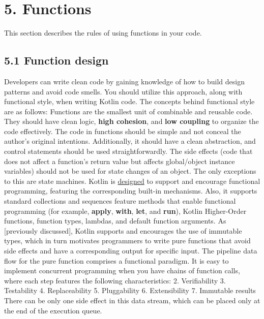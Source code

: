 \section*{\textbf{5. Functions}}
\label{sec:5.}
This section describes the rules of using functions in your code.
\subsection*{\textbf{5.1 Function design}}
\label{sec:5.1}
Developers can write clean code by gaining knowledge of how to build design patterns and avoid code smells.
You should utilize this approach, along with functional style, when writing Kotlin code.
The concepts behind functional style are as follows:
Functions are the smallest unit of combinable and reusable code.
They should have clean logic, \textbf{high cohesion}, and \textbf{low coupling} to organize the code effectively.
The code in functions should be simple and not conceal the author's original intentions.
Additionally, it should have a clean abstraction, and control statements should be used straightforwardly.
The side effects (code that does not affect a function's return value but affects global/object instance variables) should not be used for state changes of an object.
The only exceptions to this are state machines.
Kotlin is \href{https://www.slideshare.net/abreslav/whos-more-functional-kotlin-groovy-scala-or-java}{designed} to support and encourage functional programming, featuring the corresponding built-in mechanisms.
Also, it supports standard collections and sequences feature methods that enable functional programming (for example, \textbf{apply}, \textbf{with}, \textbf{let}, and \textbf{run}), Kotlin Higher-Order functions, function types, lambdas, and default function arguments.
As [previously discussed], Kotlin supports and encourages the use of immutable types, which in turn motivates programmers to write pure functions that avoid side effects and have a corresponding output for specific input.
The pipeline data flow for the pure function comprises a functional paradigm. It is easy to implement concurrent programming when you have chains of function calls, where each step features the following characteristics:
2.	Verifiability
3.	Testability
4.	Replaceability
5.	Pluggability
6.	Extensibility
7.	Immutable results
There can be only one side effect in this data stream, which can be placed only at the end of the execution queue.
